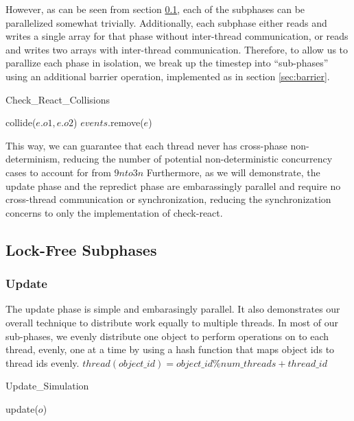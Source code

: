 \documentclass[conference]{IEEEtran}
\begin{document}
However, as can be seen from section \ref{sec:subphase}, each of the subphases can be parallelized somewhat trivially.  Additionally, each subphase either reads and writes
a single array for that phase without inter-thread communication, or reads and writes two arrays with inter-thread communication.  Therefore, to allow us to parallize each
phase in isolation, we break up the timestep into ``sub-phases'' using an additional barrier operation, implemented as in section \ref{sec:barrier}.  

\begin{algorithm}
\caption{Check\_React\_Collisions}
\begin{algorithmic}
\STATE {}
	\STATE {}
		\STATE {}
		\STATE collide($e.o1,e.o2$)
	\ENDIF
	\STATE {}
	\STATE $events$.remove($e$)
\ENDFOR
\end{algorithmic}
\end{algorithm}

This way, we can guarantee that each thread never has cross-phase non-determinism, reducing the number of potential non-deterministic concurrency cases to account for from $9n to 3n$
Furthermore, as we will demonstrate, the update phase and the repredict phase are embarassingly parallel and require no cross-thread communication or synchronization,
reducing the synchronization concerns to only the implementation of check-react.

\subsection{Lock-Free Subphases}
\label{sec:subphase}
\subsubsection{Update}

The update phase is simple and embarasingly parallel.  It also demonstrates our overall technique to distribute work equally to multiple threads.  In most of our sub-phases,
we evenly distribute one object to perform operations on to each thread, evenly, one at a time by using a hash function that maps object ids to thread ids evenly. $thread(object\_id) = object\_id \% num\_threads + thread\_id$
\begin{algorithm}
\caption{Update\_Simulation}
\begin{algorithmic}
	\STATE update($o$)
\ENDFOR
\end{algorithmic}
\end{algorithm}
\end{document}
